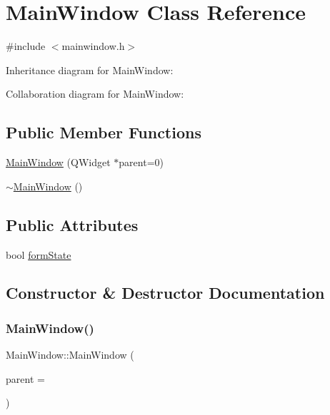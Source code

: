 \hypertarget{class_main_window}{}\section{Main\+Window Class Reference}
\label{class_main_window}


{\ttfamily \#include $<$mainwindow.\+h$>$}



Inheritance diagram for Main\+Window\+:


Collaboration diagram for Main\+Window\+:
\subsection*{Public Member Functions}
\begin{DoxyCompactItemize}
\item 
\hyperlink{class_main_window_a8b244be8b7b7db1b08de2a2acb9409db}{Main\+Window} (Q\+Widget $\ast$parent=0)
\item 
\hyperlink{class_main_window_ae98d00a93bc118200eeef9f9bba1dba7}{$\sim$\+Main\+Window} ()
\end{DoxyCompactItemize}
\subsection*{Public Attributes}
\begin{DoxyCompactItemize}
\item 
bool \hyperlink{class_main_window_ad1e712b13ea93ba85f22fd93325e2eb9}{form\+State}
\end{DoxyCompactItemize}


\subsection{Constructor \& Destructor Documentation}
\mbox{\label{class_main_window_a8b244be8b7b7db1b08de2a2acb9409db}} 
\subsubsection{\texorpdfstring{Main\+Window()}{MainWindow()}}
{\footnotesize\ttfamily Main\+Window\+::\+Main\+Window (\begin{DoxyParamCaption}\item[{Q\+Widget $\ast$}]{parent = {} }\end{DoxyParamCaption})\hspace{0.3cm}{\ttfamily [explicit]}}

